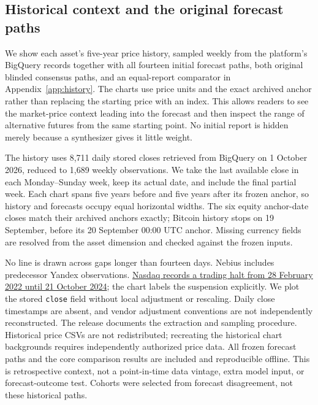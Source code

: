 \documentclass[11pt]{article}
\begin{document}
\subsection{Historical context and the original forecast paths}\label{sec:history}
We show each asset's five-year price history, sampled weekly from the platform's BigQuery records together with all fourteen initial forecast paths, both original blinded consensus paths, and an equal-report comparator in Appendix~\ref{app:history}. The charts use price units and the exact archived anchor rather than replacing the starting price with an index. This allows readers to see the market-price context leading into the forecast and then inspect the range of alternative futures from the same starting point. No initial report is hidden merely because a synthesizer gives it little weight.

The history uses 8,711 daily stored closes retrieved from BigQuery on 1 October 2026, reduced to 1,689 weekly observations. We take the last available close in each Monday--Sunday week, keep its actual date, and include the final partial week. Each chart spans five years before and five years after its frozen anchor, so history and forecasts occupy equal horizontal widths. The six equity anchor-date closes match their archived anchors exactly; Bitcoin history stops on 19 September, before its 20 September 00:00 UTC anchor. Missing currency fields are resolved from the asset dimension and checked against the frozen inputs.

No line is drawn across gaps longer than fourteen days. Nebius includes predecessor Yandex observations. \href{https://ir.nasdaq.com/news-releases/news-release-details/nasdaq-resumes-trading-nebius-group-nv}{Nasdaq records a trading halt from 28 February 2022 until 21 October 2024}; the chart labels the suspension explicitly. We plot the stored \texttt{close} field without local adjustment or rescaling. Daily close timestamps are absent, and vendor adjustment conventions are not independently reconstructed. The release documents the extraction and sampling procedure. Historical price CSVs are not redistributed; recreating the historical chart backgrounds requires independently authorized price data. All frozen forecast paths and the core comparison results are included and reproducible offline. This is retrospective context, not a point-in-time data vintage, extra model input, or forecast-outcome test. Cohorts were selected from forecast disagreement, not these historical paths.
\end{document}
